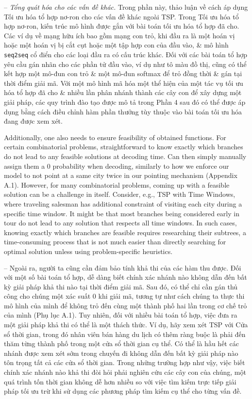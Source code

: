 \documentclass{article}
\begin{document}
\begin{itemize}
    -- {\it Tổng quát hóa cho các vấn đề khác.} Trong phần này, thảo luận về cách áp dụng Tối ưu hóa tổ hợp nơ-ron cho các vấn đề khác ngoài TSP. Trong Tối ưu hóa tổ hợp nơ-ron, kiến trúc mô hình được gắn với bài toán tối ưu hóa tổ hợp đã cho. Các ví dụ về mạng hữu ích bao gồm mạng con trỏ, khi đầu ra là một hoán vị hoặc một hoán vị bị cắt cụt hoặc một tập hợp con của đầu vào, \& mô hình {\tt seq2seq} cổ điển cho các loại đầu ra có cấu trúc khác. Đối với các bài toán tổ hợp yêu cầu gán nhãn cho các phần tử đầu vào, ví dụ như tô màu đồ thị, cũng có thể kết hợp một mô-đun con trỏ \& một mô-đun softmax để trỏ đồng thời \& gán tại thời điểm giải mã. Với một mô hình mã hóa một thể hiện của một tác vụ tối ưu hóa tổ hợp đã cho \& nhiều lần phân nhánh thành các cây con để xây dựng một giải pháp, các quy trình đào tạo được mô tả trong Phần 4 sau đó có thể được áp dụng bằng cách điều chỉnh hàm phần thưởng tùy thuộc vào bài toán tối ưu hóa đang được xem xét.
    
    Additionally, one also needs to ensure feasibility of obtained functions. For certain combinatorial problems, straightforward to know exactly which branches do not lead to any feasible solutions at decoding time. Can then simply manually assign them a 0 probability when decoding, similarly to how we enforce our model to not point at a same city twice in our pointing mechanism (Appendix A.1). However, for many combinatorial problems, coming up with a feasible solution can be a challenge in itself. Consider, e.g., TSP with Time Windows, where traveling salesman has additional constraint of visiting each city during a specific time window. It might be that most branches being considered early in tour do not lead to any solution that respects all time windows. In such cases, knowing exactly which branches are feasible requires researching their subtrees, a time-consuming process that is not much easier than directly searching for optimal solution unless using problem-specific heuristics.
    
    -- Ngoài ra, người ta cũng cần đảm bảo tính khả thi của các hàm thu được. Đối với một số bài toán tổ hợp, dễ dàng biết chính xác nhánh nào không dẫn đến bất kỳ giải pháp khả thi nào tại thời điểm giải mã. Sau đó, có thể chỉ cần gán thủ công cho chúng một xác suất 0 khi giải mã, tương tự như cách chúng ta thực thi mô hình của mình để không trỏ đến cùng một thành phố hai lần trong cơ chế trỏ của mình (Phụ lục A.1). Tuy nhiên, đối với nhiều bài toán tổ hợp, việc đưa ra một giải pháp khả thi có thể là một thách thức. Ví dụ, hãy xem xét TSP với Cửa sổ thời gian, trong đó nhân viên bán hàng du lịch có thêm ràng buộc là phải đến thăm từng thành phố trong một cửa sổ thời gian cụ thể. Có thể là hầu hết các nhánh được xem xét sớm trong chuyến đi không dẫn đến bất kỳ giải pháp nào tôn trọng tất cả các cửa sổ thời gian. Trong những trường hợp như vậy, việc biết chính xác nhánh nào khả thi đòi hỏi phải nghiên cứu các cây con của chúng, một quá trình tốn thời gian không dễ hơn nhiều so với việc tìm kiếm trực tiếp giải pháp tối ưu trừ khi sử dụng các phương pháp tìm kiếm cụ thể cho từng vấn đề.
    

\end{itemize}
\end{document}

